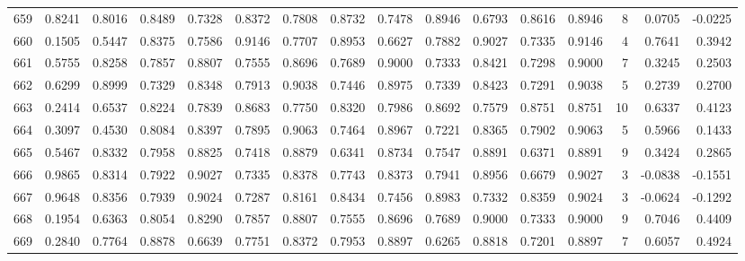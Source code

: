 \begin{tabular}{lrrrrrrrrrrrrrrr}
659 &      0.8241 &  0.8016 &  0.8489 &  0.7328 &  0.8372 &  0.7808 &  0.8732 &  0.7478 &  0.8946 &  0.6793 &   0.8616 &     0.8946 &      8 &                    0.0705 &                    -0.0225 \\
660 &      0.1505 &  0.5447 &  0.8375 &  0.7586 &  0.9146 &  0.7707 &  0.8953 &  0.6627 &  0.7882 &  0.9027 &   0.7335 &     0.9146 &      4 &                    0.7641 &                     0.3942 \\
661 &      0.5755 &  0.8258 &  0.7857 &  0.8807 &  0.7555 &  0.8696 &  0.7689 &  0.9000 &  0.7333 &  0.8421 &   0.7298 &     0.9000 &      7 &                    0.3245 &                     0.2503 \\
662 &      0.6299 &  0.8999 &  0.7329 &  0.8348 &  0.7913 &  0.9038 &  0.7446 &  0.8975 &  0.7339 &  0.8423 &   0.7291 &     0.9038 &      5 &                    0.2739 &                     0.2700 \\
663 &      0.2414 &  0.6537 &  0.8224 &  0.7839 &  0.8683 &  0.7750 &  0.8320 &  0.7986 &  0.8692 &  0.7579 &   0.8751 &     0.8751 &     10 &                    0.6337 &                     0.4123 \\
664 &      0.3097 &  0.4530 &  0.8084 &  0.8397 &  0.7895 &  0.9063 &  0.7464 &  0.8967 &  0.7221 &  0.8365 &   0.7902 &     0.9063 &      5 &                    0.5966 &                     0.1433 \\
665 &      0.5467 &  0.8332 &  0.7958 &  0.8825 &  0.7418 &  0.8879 &  0.6341 &  0.8734 &  0.7547 &  0.8891 &   0.6371 &     0.8891 &      9 &                    0.3424 &                     0.2865 \\
666 &      0.9865 &  0.8314 &  0.7922 &  0.9027 &  0.7335 &  0.8378 &  0.7743 &  0.8373 &  0.7941 &  0.8956 &   0.6679 &     0.9027 &      3 &                   -0.0838 &                    -0.1551 \\
667 &      0.9648 &  0.8356 &  0.7939 &  0.9024 &  0.7287 &  0.8161 &  0.8434 &  0.7456 &  0.8983 &  0.7332 &   0.8359 &     0.9024 &      3 &                   -0.0624 &                    -0.1292 \\
668 &      0.1954 &  0.6363 &  0.8054 &  0.8290 &  0.7857 &  0.8807 &  0.7555 &  0.8696 &  0.7689 &  0.9000 &   0.7333 &     0.9000 &      9 &                    0.7046 &                     0.4409 \\
669 &      0.2840 &  0.7764 &  0.8878 &  0.6639 &  0.7751 &  0.8372 &  0.7953 &  0.8897 &  0.6265 &  0.8818 &   0.7201 &     0.8897 &      7 &                    0.6057 &                     0.4924 \\

\end{tabular}

